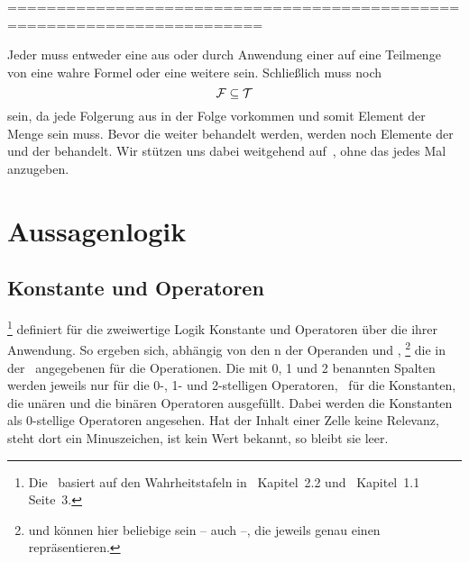 ========================================================================

Jeder   muss entweder eine  aus \objqt{\Voraussetzungsmenge} oder durch Anwendung einer  auf eine Teilmenge von  eine wahre Formel oder eine weitere  sein.
Schließlich muss noch
\[ \mathcal{F} \subseteq \mathcal{T} \]
sein, da jede Folgerung aus \objqt{\Folgerungsmenge} in der Folge \objqt{\Beweisschrittfolge} vorkommen und somit Element der Menge \objqt{\Beweisschrittmenge} sein muss.
%
Bevor die  weiter behandelt werden, werden noch Elemente der \emph{} und der \emph{} behandelt.
Wir stützen uns dabei weitgehend auf~\cite{bib:Rautenberg}, ohne das jedes Mal anzugeben.

\section{Aussagenlogik}%
\label{sec:Aussagenlogik}

\subsection{Konstante und Operatoren}%
\label{sub:Operatoren}

%
\footnote{%
	Die \tablename\ basiert auf den Wahrheitstafeln in~\cite{bib:Junktor} Kapitel~2.2 und~\cite{bib:Rautenberg} Kapitel~1.1 Seite~3.%
}
definiert für die zweiwertige Logik Konstante und Operatoren über die  ihrer Anwendung.
So ergeben sich, abhängig von den n der Operanden  und ,%
\footnote{%
	 und  können hier beliebige  sein -- auch  --, die jeweils genau einen  repräsentieren.%
}
die in der \tablename\ angegebenen  für die Operationen.
Die mit 0, 1 und 2 benannten Spalten werden jeweils nur für die 0-, 1- und 2-stelligen Operatoren, \textdh\ für die Konstanten, die unären und die binären Operatoren ausgefüllt.
Dabei werden die Konstanten als 0-stellige Operatoren angesehen.
Hat der Inhalt einer Zelle keine Relevanz, steht dort ein Minuszeichen, ist kein Wert bekannt, so bleibt sie leer.

